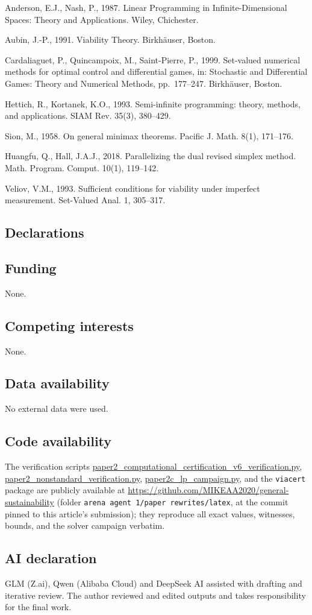 \documentclass[10pt,twocolumn]{article}
\theoremstyle{plain}
\theoremstyle{definition}
\theoremstyle{remark}
\begin{document}
Anderson, E.J., Nash, P., 1987. Linear Programming in Infinite-Dimensional
Spaces: Theory and Applications. Wiley, Chichester.

Aubin, J.-P., 1991. Viability Theory. Birkh\"auser, Boston.

Cardaliaguet, P., Quincampoix, M., Saint-Pierre, P., 1999. Set-valued
numerical methods for optimal control and differential games, in:
Stochastic and Differential Games: Theory and Numerical Methods,
pp.~177--247. Birkh\"auser, Boston.

Hettich, R., Kortanek, K.O., 1993. Semi-infinite programming: theory,
methods, and applications. SIAM Rev. 35(3), 380--429.

Sion, M., 1958. On general minimax theorems. Pacific J. Math. 8(1),
171--176.

Huangfu, Q., Hall, J.A.J., 2018. Parallelizing the dual revised simplex
method. Math. Program. Comput. 10(1), 119--142.

Veliov, V.M., 1993. Sufficient conditions for viability under imperfect
measurement. Set-Valued Anal. 1, 305--317.

\subsection*{Declarations}

\subsection*{Funding}
None.

\subsection*{Competing interests}
None.

\subsection*{Data availability}
No external data were used.

\subsection*{Code availability}
The verification scripts
\url{paper2_computational_certification_v6_verification.py},
\url{paper2_nonstandard_verification.py},
\url{paper2c_lp_campaign.py}, and the \texttt{viacert} package are publicly
available at \url{https://github.com/MIKEAA2020/general-sustainability}
(folder \texttt{arena agent 1/paper rewrites/latex}, at the commit
pinned to this article's submission); they reproduce all exact values,
witnesses, bounds, and the solver campaign verbatim.

\subsection*{AI declaration}
GLM (Z.ai), Qwen (Alibaba Cloud) and DeepSeek AI assisted with drafting
and iterative review. The author reviewed and edited outputs and takes
responsibility for the final work.
\end{document}

